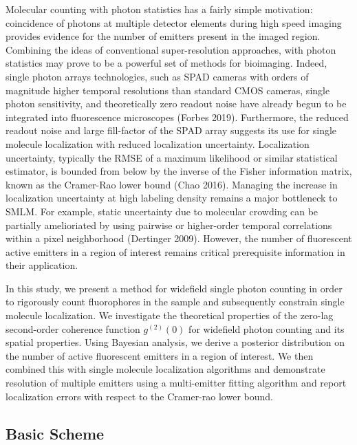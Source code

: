 \documentclass[a4paper, twocolumn, superscriptaddress,prl]{revtex4}  %
\begin{document}
Molecular counting with photon statistics has a fairly simple motivation: coincidence of photons at multiple detector elements during high speed imaging provides evidence for the number of emitters present in the imaged region. Combining the ideas of conventional super-resolution approaches, with photon statistics may prove to be a powerful set of methods for bioimaging. Indeed, single photon arrays technologies, such as SPAD cameras with orders of magnitude higher temporal resolutions than standard CMOS cameras, single photon sensitivity, and theoretically zero readout noise have already begun to be integrated into fluorescence microscopes (Forbes 2019). Furthermore, the reduced readout noise and large fill-factor of the SPAD array suggests its use for single molecule localization with reduced localization uncertainty. Localization uncertainty, typically the RMSE of a maximum likelihood or similar statistical estimator, is bounded from below by the inverse of the Fisher information matrix, known as the Cramer-Rao lower bound (Chao 2016). Managing the increase in localization uncertainty at high labeling density remains a major bottleneck to SMLM. For example, static uncertainty due to molecular crowding can be partially amelioriated by using pairwise or higher-order temporal correlations within a pixel neighborhood (Dertinger 2009). However, the number of fluorescent active emitters in a region of interest remains critical prerequisite information in their application.

In this study, we present a method for widefield single photon counting in order to rigorously count fluorophores in the sample and subsequently constrain single molecule localization. We investigate the theoretical properties of the zero-lag second-order coherence function $g^{(2)}(0)$ for widefield photon counting and its spatial properties. Using Bayesian analysis, we derive a posterior distribution on the number of active fluorescent emitters in a region of interest. We then combined this with single molecule localization algorithms and demonstrate resolution of multiple emitters using a multi-emitter fitting algorithm and report localization errors with respect to the Cramer-rao lower bound.

\subsection{Basic Scheme}
\end{document}
